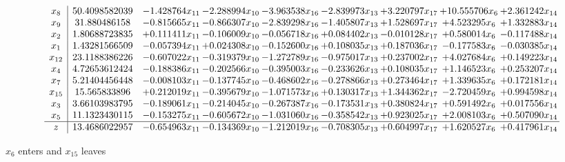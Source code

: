 \documentclass[10pt]{article}
\begin{document}
 \[\begin{array}{c| c c@{\hskip 2pt} c@{\hskip 2pt} c@{\hskip 2pt} c@{\hskip 2pt} c@{\hskip 2pt} c@{\hskip 2pt} c@{\hskip 2pt} }
 x_{8}   &  50.4098582039 & -1.428764 x_{11} & -2.288994 x_{10} & -3.963538 x_{16} & -2.839973 x_{13} & + 3.220797 x_{17} & + 10.555706 x_{6} & + 2.361242 x_{14}\\
 x_{9}   &  31.880486158 & -0.815665 x_{11} & -0.866307 x_{10} & -2.839298 x_{16} & -1.405807 x_{13} & + 1.528697 x_{17} & + 4.523295 x_{6} & + 1.332883 x_{14}\\
 x_{2}   &  1.80688723835 & + 0.111411 x_{11} & -0.106009 x_{10} & -0.056718 x_{16} & + 0.084402 x_{13} & -0.010128 x_{17} & + 0.580014 x_{6} & -0.117488 x_{14}\\
 x_{1}   &  1.43281566509 & -0.057394 x_{11} & + 0.024308 x_{10} & -0.152600 x_{16} & + 0.108035 x_{13} & + 0.187036 x_{17} & -0.177583 x_{6} & -0.030385 x_{14}\\
 x_{12}   &  23.1188386226 & -0.607022 x_{11} & -0.319379 x_{10} & -1.272789 x_{16} & -0.975017 x_{13} & + 0.237002 x_{17} & + 4.027684 x_{6} & + 0.149223 x_{14}\\
 x_{4}   &  4.72653612424 & -0.188386 x_{11} & -0.202566 x_{10} & -0.395003 x_{16} & -0.233626 x_{13} & + 0.108035 x_{17} & + 1.146523 x_{6} & + 0.253207 x_{14}\\
 x_{7}   &  5.21404456448 & -0.008103 x_{11} & -0.137745 x_{10} & -0.468602 x_{16} & -0.278866 x_{13} & + 0.273464 x_{17} & + 1.339635 x_{6} & + 0.172181 x_{14}\\
 x_{15}   &  15.565833896 & + 0.212019 x_{11} & -0.395679 x_{10} & -1.071573 x_{16} & + 0.130317 x_{13} & + 1.344362 x_{17} & -2.720459 x_{6} & + 0.994598 x_{14}\\
 x_{3}   &  3.66103983795 & -0.189061 x_{11} & -0.214045 x_{10} & -0.267387 x_{16} & -0.173531 x_{13} & + 0.380824 x_{17} & + 0.591492 x_{6} & + 0.017556 x_{14}\\
 x_{5}   &  11.1323430115 & -0.153275 x_{11} & -0.605672 x_{10} & -1.031060 x_{16} & -0.358542 x_{13} & + 0.923025 x_{17} & + 2.008103 x_{6} & + 0.507090 x_{14}\\
\hline
z    &  13.4686022957 & -0.654963 x_{11} & -0.134369 x_{10} & -1.212019 x_{16} & -0.708305 x_{13} & + 0.604997 x_{17} & + 1.620527 x_{6} & + 0.417961 x_{14}\\
\end{array}\]


 $ x_{6} $ enters and $ x_{15} $ leaves 
\end{document}
